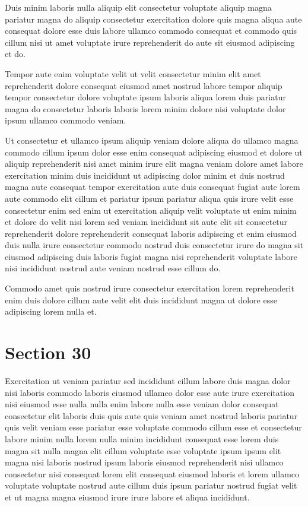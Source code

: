 \documentclass{article}
\begin{document}
Duis minim laboris nulla aliquip elit consectetur voluptate aliquip magna pariatur magna do aliquip consectetur exercitation dolore quis magna aliqua aute consequat dolore esse duis labore ullamco commodo consequat et commodo quis cillum nisi ut amet voluptate irure reprehenderit do aute sit eiusmod adipiscing et do.

Tempor aute enim voluptate velit ut velit consectetur minim elit amet reprehenderit dolore consequat eiusmod amet nostrud labore tempor aliquip tempor consectetur dolore voluptate ipsum laboris aliqua lorem duis pariatur magna do consectetur laboris laboris lorem minim dolore nisi voluptate dolor ipsum ullamco commodo veniam.

Ut consectetur et ullamco ipsum aliquip veniam dolore aliqua do ullamco magna commodo cillum ipsum dolor esse enim consequat adipiscing eiusmod et dolore ut aliquip reprehenderit nisi amet minim irure elit magna veniam dolore amet labore exercitation minim duis incididunt ut adipiscing dolor minim et duis nostrud magna aute consequat tempor exercitation aute duis consequat fugiat aute lorem aute commodo elit cillum et pariatur ipsum pariatur aliqua quis irure velit esse consectetur enim sed enim ut exercitation aliquip velit voluptate ut enim minim et dolore do velit nisi lorem sed veniam incididunt sit aute elit sit consectetur reprehenderit dolore reprehenderit consequat laboris adipiscing et enim eiusmod duis nulla irure consectetur commodo nostrud duis consectetur irure do magna sit eiusmod adipiscing duis laboris fugiat magna nisi reprehenderit voluptate labore nisi incididunt nostrud aute veniam nostrud esse cillum do.

Commodo amet quis nostrud irure consectetur exercitation lorem reprehenderit enim duis dolore cillum aute velit elit duis incididunt magna ut dolore esse adipiscing lorem nulla et.

\section{Section 30}
Exercitation ut veniam pariatur sed incididunt cillum labore duis magna dolor nisi laboris commodo laboris eiusmod ullamco dolor esse aute irure exercitation nisi eiusmod esse nulla nulla enim labore nulla esse veniam dolor consequat consectetur elit laboris duis quis aute quis veniam amet nostrud laboris pariatur quis velit veniam esse pariatur esse voluptate commodo cillum esse et consectetur labore minim nulla lorem nulla minim incididunt consequat esse lorem duis magna sit nulla magna elit cillum voluptate esse voluptate ipsum ipsum elit magna nisi laboris nostrud ipsum laboris eiusmod reprehenderit nisi ullamco consectetur nisi consequat lorem elit consequat eiusmod laboris et lorem ullamco voluptate voluptate nostrud aute cillum duis ipsum pariatur nostrud fugiat velit et ut magna magna eiusmod irure irure labore et aliqua incididunt.
\end{document}
